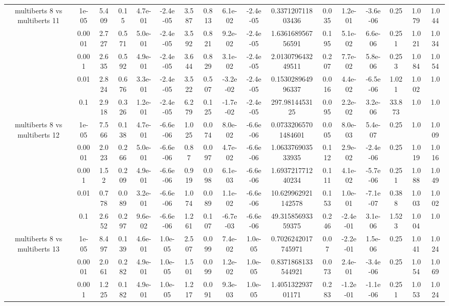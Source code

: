 \begin{tabular}{|c|c|c|c|c|c|c|c|c|c|c|c|c|c|c|c|c|}
\hline
\multirow{5}{*}{multiberts 8 vs multiberts 11} & 1e-05 & 5.409 & 0.15 & 4.7e-01 & -2.4e-05 & 3.587 & 0.813 & 6.1e-02 & -2.4e-05 & 0.337120711803436 & 0.035 & 1.2e-01 & -3.6e-06 & 0.25 & 1.079 & 1.044 \\
 & 0.0001 & 2.727 & 0.571 & 5.0e-01 & -2.4e-05 & 3.592 & 0.821 & 9.2e-02 & -2.4e-05 & 1.636168956756591 & 0.195 & 5.1e-02 & 6.6e-06 & 0.251 & 1.021 & 1.034 \\
 & 0.001 & 2.635 & 0.592 & 4.9e-01 & -2.4e-05 & 3.644 & 0.829 & 3.1e-02 & -2.4e-05 & 2.013079643249511 & 0.207 & 7.7e-02 & 5.8e-06 & 0.253 & 1.084 & 1.054 \\
 & 0.01 & 2.824 & 0.676 & 3.3e-01 & -2.4e-05 & 3.522 & 0.507 & -3.2e-02 & -2.4e-05 & 0.153028964996337 & 0.016 & 4.4e-02 & -6.5e-06 & 1.021 & 1.002 & 1.0 \\
 & 0.1 & 2.918 & 0.326 & 1.2e-01 & -2.4e-05 & 6.279 & 0.125 & -1.7e-02 & -2.4e-05 & 297.9814453125 & 0.095 & 2.2e-02 & 3.2e-06 & 33.873 & 1.0 & 1.0 \\
\hline
\multirow{5}{*}{multiberts 8 vs multiberts 12} & 1e-05 & 7.566 & 0.138 & 4.7e-01 & -6.6e-06 & 1.025 & 0.074 & 8.0e-02 & -6.6e-06 & 0.07332065701484601 & 0.005 & 8.0e-03 & 5.4e-07 & 0.25 & 1.0 & 1.009 \\
 & 0.0001 & 2.023 & 0.266 & 5.0e-01 & -6.6e-06 & 0.87 & 0.097 & 4.7e-02 & -6.6e-06 & 1.063376903533935 & 0.112 & 2.9e-02 & -2.4e-06 & 0.25 & 1.019 & 1.016 \\
 & 0.001 & 1.52 & 0.209 & 4.9e-01 & -6.6e-06 & 0.919 & 0.098 & 6.1e-03 & -6.6e-06 & 1.693721771240234 & 0.111 & 4.1e-02 & -5.7e-06 & 0.251 & 1.088 & 1.049 \\
 & 0.01 & 0.778 & 0.089 & 3.2e-01 & -6.6e-06 & 1.074 & 0.089 & 1.1e-02 & -6.6e-06 & 10.629962921142578 & 0.153 & 1.0e-01 & -7.1e-07 & 0.388 & 1.003 & 1.002 \\
 & 0.1 & 2.652 & 0.297 & 9.6e-02 & -6.6e-06 & 1.261 & 0.107 & -6.7e-03 & -6.6e-06 & 49.31585693359375 & 0.246 & -2.4e-01 & 3.1e-06 & 1.523 & 1.004 & 1.0 \\
\hline
\multirow{5}{*}{multiberts 8 vs multiberts 13} & 1e-05 & 8.497 & 0.139 & 4.6e-01 & 1.0e-05 & 2.507 & 0.099 & 7.4e-02 & 1.0e-05 & 0.7026242017745971 & 0.07 & -2.2e-01 & 1.5e-06 & 0.25 & 1.041 & 1.024 \\
 & 0.0001 & 2.061 & 0.282 & 4.9e-01 & 1.0e-05 & 1.501 & 0.099 & 1.2e-02 & 1.0e-05 & 0.8371868133544921 & 0.073 & 2.4e-01 & -3.4e-06 & 0.25 & 1.054 & 1.069 \\
 & 0.001 & 1.225 & 0.182 & 4.9e-01 & 1.0e-05 & 1.217 & 0.091 & 9.3e-03 & 1.0e-05 & 1.405132293701171 & 0.283 & -1.2e-01 & -1.1e-06 & 0.251 & 1.053 & 1.024 \\

\end{tabular}
